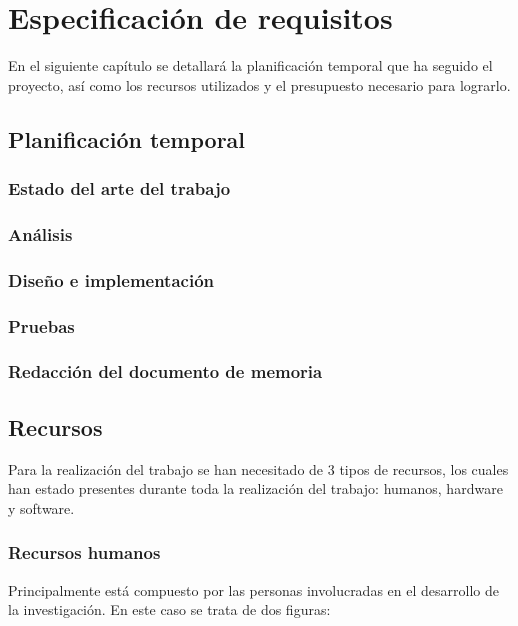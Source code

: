 \chapter{Especificación de requisitos}

En el siguiente capítulo se detallará la planificación temporal que ha seguido el proyecto, así como los recursos
utilizados y el presupuesto necesario para lograrlo.

\section{Planificación temporal}

\subsection{Estado del arte del trabajo}

\subsection{Análisis}

\subsection{Diseño e implementación}

\subsection{Pruebas}

\subsection{Redacción del documento de memoria}

\section{Recursos}

Para la realización del trabajo se han necesitado de 3 tipos de recursos, los cuales han estado presentes durante toda
la realización del trabajo: humanos, hardware y software.

\subsection{Recursos humanos}

Principalmente está compuesto por las personas involucradas en el desarrollo de la investigación. En este caso se trata
de dos figuras:

